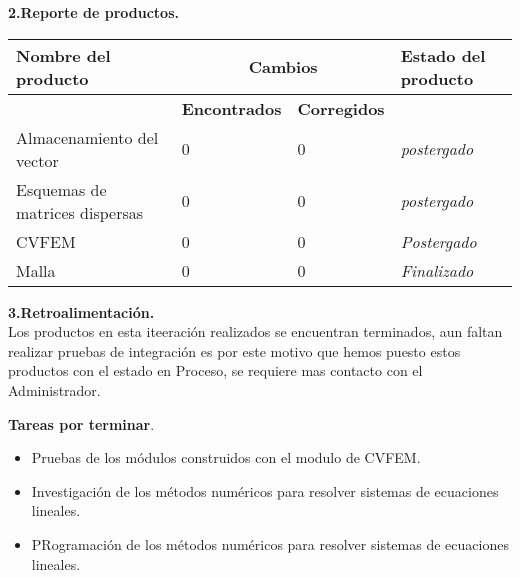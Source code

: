 \documentclass[12pt]{report}
\numberwithin{equation}{section}
\begin{document}
\begin{flushleft}

\textbf{2.Reporte de productos.}\\

\begin{table}[H]
\begin{tabular}{|m{4cm}|m{3cm}|m{3cm}|m{5cm}|}
\hline
\textbf{Nombre del producto} & \multicolumn{2}{c|}{\textbf{Cambios}}  
 & \textbf{Estado del producto}\\
 \hline
 & \textbf{Encontrados} &\textbf{Corregidos} & \\
\hline
\small{Almacenamiento del vector} & 0 & 0 &\scriptsize{\textit{postergado}} \\
\hline 
\small{Esquemas de matrices dispersas}& 0 & 0 & \scriptsize{\textit{{postergado}}} \\
\hline
\small{CVFEM}  & 0 & 0 &\scriptsize{\textit{Postergado}} \\
\hline
\small{Malla} & 0 & 0 &\scriptsize{\textit{Finalizado}} \\
\hline
\end{tabular}
\label{tabla: TABLA Actividades CE }
\end{table}


\textbf{3.Retroalimentaci\'on.}\\

\small{Los productos en esta iteeraci\'on realizados se encuentran terminados, aun faltan realizar pruebas de integraci\'on es por este motivo que hemos puesto estos productos con el estado en Proceso, se requiere mas contacto con el Administrador.}

\small{\textbf{Tareas por terminar}.  \begin{itemize}
\item Pruebas de los módulos construidos con el modulo de CVFEM.
\item Investigaci\'on de los métodos numéricos para resolver sistemas de ecuaciones lineales.
\item PRogramaci\'on de los m\'etodos num\'ericos para resolver sistemas de ecuaciones lineales.
\end{itemize}}



\end{flushleft}
\end{document}
